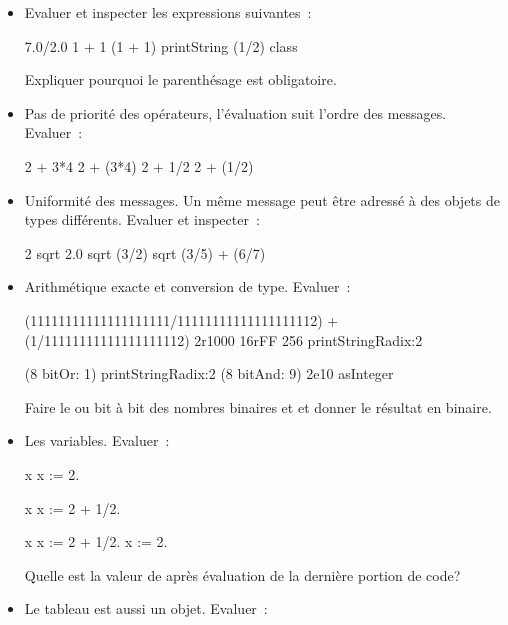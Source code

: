 \begin{itemize}
\item Evaluer et inspecter les expressions suivantes~:
\begin{scode}
7.0/2.0
1 + 1
(1 + 1) printString
(1/2) class
\end{scode}
Expliquer pourquoi le parenth\'esage est obligatoire.
\item Pas de priorit\'e des op\'erateurs, l'\'evaluation suit l'ordre des messages. Evaluer~:
\begin{scode}
2 + 3*4
2 + (3*4)
2  + 1/2
2 + (1/2)
\end{scode}
\item Uniformit\'e des messages. Un m\^eme message peut \^etre adress\'e
\`a des objets de types diff\'erents. Evaluer et inspecter~:
\begin{scode}
2 sqrt
2.0 sqrt
(3/2) sqrt
(3/5) + (6/7)
\end{scode}
\item Arithm\'etique exacte et conversion de type. Evaluer~:
\begin{scode}
(11111111111111111111/11111111111111111112) + (1/11111111111111111112)
2r1000
16rFF
256 printStringRadix:2

(8 bitOr: 1) printStringRadix:2
(8 bitAnd: 9)
2e10 asInteger
\end{scode}
Faire le ou bit \`a bit des nombres binaires  et  et donner le r\'esultat en binaire.
\item Les variables. Evaluer~:
\begin{scode}
\stBar x \stBar
x := 2.

\stBar x \stBar
x := 2 + 1/2.

\stBar x \stBar
x := 2 + 1/2.
x := 2.
\end{scode}
Quelle est la valeur de  apr\`es \'evaluation de la derni\`ere portion de code?
\item Le tableau est aussi un objet. Evaluer~:





\end{itemize}
